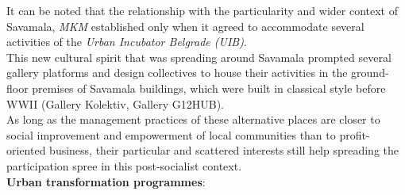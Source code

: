 \documentclass[11pt]{report}
\begin{document}
It can be noted that the relationship with the particularity and wider context of Savamala, \textit{MKM} established only when it agreed to accommodate several activities of the \textit{Urban Incubator Belgrade (UIB)}.
\\
This new cultural spirit that was spreading around Savamala prompted several gallery platforms and design collectives to house their activities in the ground-floor premises of Savamala buildings, which were built in classical style before WWII (Gallery Kolektiv, Gallery G12HUB).
\\
As long as the management practices of these alternative places are closer to social improvement and empowerment of local communities than to profit-oriented business, their particular and scattered interests still help spreading the participation spree in this post-socialist context.
\\	
\textbf{Urban transformation programmes}:
\end{document}
